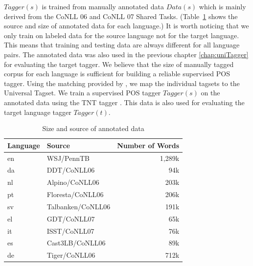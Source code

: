 $Tagger(s)$ is trained from manually annotated data $Data(s)$ which is mainly derived from the CoNLL 06 and CoNLL 07 Shared Tasks. (Table~\ref{tbl:annotatedDataNew} shows the source and size of annotated data for each language.) It is worth noticing that we only train on labeled data for the source language not for the target language. This means that training and testing data are always different for all language pairs. The annotated data was also used in the previous chapter \ref{chap:uniTagger} for evaluating the target tagger. We believe that the size of manually tagged corpus for each language is sufficient for building a reliable supervised POS tagger. Using the matching provided by , we map the individual tagsets to the Universal Tagset. We train a supervised POS tagger $Tagger(s)$ on the annotated data using the TNT tagger \cite{TNTTagger}. This data is also used for evaluating the target language tagger $Tagger(t)$. 
\begin{table}
\small
\centering
    \begin{tabular}{lp{3cm}r}
    Language & Source & Number of Words \\
    \hline
    en       & WSJ/PennTB & 1,289k         \\
    da       & DDT/CoNLL06& 94k           \\
    nl       & Alpino/CoNLL06& 203k          \\
    pt       & Floresta/CoNLL06& 206k          \\
    sv       & Talbanken/CoNLL06& 191k          \\
    el       & GDT/CoNLL07& 65k           \\
    it       & ISST/CoNLL07& 76k           \\
    es       & Cast3LB/CoNLL06& 89k           \\
    de       & Tiger/CoNLL06& 712k          \\
    \end{tabular}
    \caption{Size and source of annotated data}
    \label{tbl:annotatedDataNew}
\end{table}


